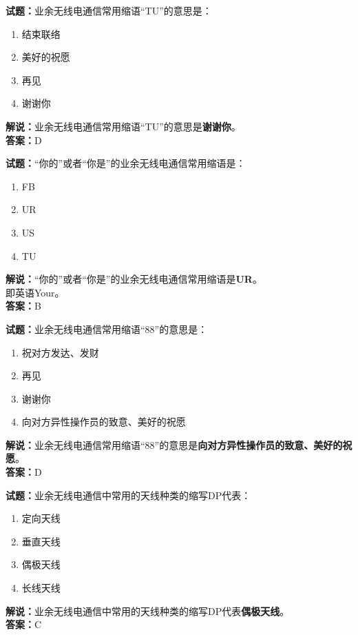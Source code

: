 \documentclass{ctexbook}
\begin{document}
\bigskip


\noindent\textbf{试题：}业余无线电通信常用缩语“TU”的意思是：
\begin{enumerate}[leftmargin=3em]
\item 结束联络
\item 美好的祝愿
\item 再见
\item 谢谢你
\end{enumerate}
\noindent\textbf{解说：}业余无线电通信常用缩语“TU”的意思是\textbf{谢谢你}。\\\noindent\textbf{答案：}D



\bigskip


\noindent\textbf{试题：}“你的”或者“你是”的业余无线电通信常用缩语是：
\begin{enumerate}[leftmargin=3em]
\item FB
\item UR
\item US
\item TU
\end{enumerate}
\noindent\textbf{解说：}“你的”或者“你是”的业余无线电通信常用缩语是\textbf{UR}。\\即英语Your。\\\noindent\textbf{答案：}B



\bigskip


\noindent\textbf{试题：}业余无线电通信常用缩语“88”的意思是：
\begin{enumerate}[leftmargin=3em]
\item 祝对方发达、发财
\item 再见
\item 谢谢你
\item 向对方异性操作员的致意、美好的祝愿
\end{enumerate}
\noindent\textbf{解说：}业余无线电通信常用缩语“88”的意思是\textbf{向对方异性操作员的致意、美好的祝愿}。\\\noindent\textbf{答案：}D



\bigskip


\noindent\textbf{试题：}业余无线电通信中常用的天线种类的缩写DP代表：
\begin{enumerate}[leftmargin=3em]
\item 定向天线
\item 垂直天线
\item 偶极天线
\item 长线天线
\end{enumerate}
\noindent\textbf{解说：}业余无线电通信中常用的天线种类的缩写DP代表\textbf{偶极天线}。\\\noindent\textbf{答案：}C
\end{document}
